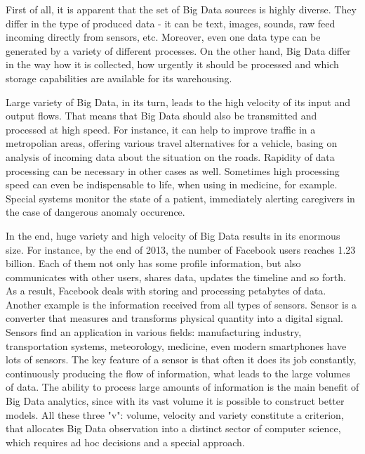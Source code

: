 First of all, it is apparent that the set of Big Data sources is highly diverse.
They differ in the type of produced data - it can be text, images, sounds, raw feed incoming directly from sensors, etc.
Moreover, even one data type can be generated by a variety of different processes. 
On the other hand, Big Data differ in the way how it is collected, how urgently it should be processed and which storage capabilities are available for its warehousing.

Large variety of Big Data, in its turn, leads to the high velocity of its input and output flows. 
That means that Big Data should also be transmitted and processed at high speed.
For instance, it can help to improve traffic in a metropolian areas, offering various travel alternatives for a vehicle, basing on analysis of incoming data about the situation on the roads.
Rapidity of data processing can be necessary in other cases as well.
Sometimes high processing speed can even be indispensable to life, when using in medicine, for example.
Special systems monitor the state of a patient, immediately alerting caregivers in the case of dangerous anomaly occurence. 

In the end, huge variety and high velocity of Big Data results in its enormous size.
For instance, by the end of 2013, the number of Facebook users reaches 1.23 billion.
Each of them not only has some profile information, but also communicates with other users, shares data, updates the timeline and so forth.
As a result, Facebook deals with storing and processing petabytes of data.
Another example is the information received from all types of sensors.
Sensor is a converter that measures and transforms physical quantity into a digital signal.
Sensors find an application in various fields: manufacturing industry, transportation systems, meteorology, medicine, even modern smartphones have lots of sensors.
The key feature of a sensor is that often it does its job constantly, continuously producing the flow of information, what leads to the large volumes of data.
The ability to process large amounts of information is the main benefit of Big Data analytics, since with its vast volume it is possible to construct better models.
All these three "v": volume, velocity and variety constitute a criterion, that allocates Big Data observation into a distinct sector of computer science, which requires ad hoc decisions and a special approach.

